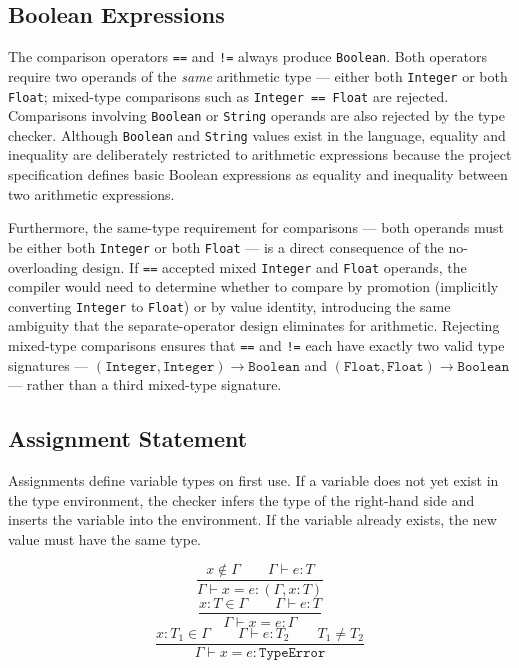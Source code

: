 \subsection{Boolean Expressions}
The comparison operators \texttt{==} and \texttt{!=} always produce
\texttt{Boolean}. Both operators require two operands of the \emph{same}
arithmetic type --- either both \texttt{Integer} or both \texttt{Float};
mixed-type comparisons such as \texttt{Integer == Float} are rejected.
Comparisons involving \texttt{Boolean} or \texttt{String} operands are also
rejected by the type checker.
Although \texttt{Boolean} and \texttt{String} values exist in the language,
equality and inequality are deliberately restricted to arithmetic expressions
because the project specification defines basic Boolean expressions as equality
and inequality between two arithmetic expressions.

Furthermore, the same-type requirement for comparisons --- both operands must be
either both \texttt{Integer} or both \texttt{Float} --- is a direct consequence
of the no-overloading design. If \texttt{==} accepted mixed \texttt{Integer} and
\texttt{Float} operands, the compiler would need to determine whether to compare
by promotion (implicitly converting \texttt{Integer} to \texttt{Float}) or by
value identity, introducing the same ambiguity that the separate-operator design
eliminates for arithmetic. Rejecting mixed-type comparisons ensures that
\texttt{==} and \texttt{!=} each have exactly two valid type signatures ---
$(\texttt{Integer}, \texttt{Integer}) \rightarrow \texttt{Boolean}$ and
$(\texttt{Float}, \texttt{Float}) \rightarrow \texttt{Boolean}$ --- rather than a
third mixed-type signature.

\subsection{Assignment Statement}
Assignments define variable types on first use. If a variable does not yet
exist in the type environment, the checker infers the type of the right-hand
side and inserts the variable into the environment. If the variable already
exists, the new value must have the same type.

\[
  \frac{x \notin \Gamma \qquad \Gamma \vdash e : T}
       {\Gamma \vdash x = e : (\Gamma, x:T)}
\]
\[
  \frac{x:T \in \Gamma \qquad \Gamma \vdash e : T}
       {\Gamma \vdash x = e : \Gamma}
\]
\[
  \frac{x:T_1 \in \Gamma \qquad \Gamma \vdash e : T_2 \qquad T_1 \neq T_2}
  {\Gamma \vdash x = e : \texttt{TypeError}}
\]

